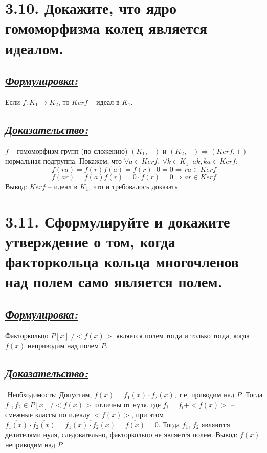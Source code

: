 \documentclass{article}
\begin{document}
\section*{\LARGE 3.10. Докажите, что ядро гомоморфизма колец является идеалом. }
\subsection*{\Large \underline{\textit{Формулировка: }}}
Если $f : K_1 \rightarrow K_2$, то $Kerf$ -- идеал в $K_1$. 

\subsection*{\Large \underline{\textit{Доказательство: }}}
$f$ -- гомоморфизм групп (по сложению) $(K_1, +)$ и $(K_2, +) \Rightarrow (Kerf, +)$ -- нормальная подгруппа. Покажем, что $\forall a \in Kerf,\: \forall k \in K_1 \;\; ak, ka \in Kerf$:
$$f(ra) = f(r)f(a) = f(r)\cdot 0 = 0 \Rightarrow ra \in Kerf$$
$$f(ar) = f(a)f(r) = 0\cdot f(r) = 0 \Rightarrow ar \in Kerf$$
Вывод: $Kerf$ -- идеал в $K_1$, что и требовалось доказать.

\section*{\LARGE 3.11. Сформулируйте и докажите утверждение о том, когда факторкольца кольца многочленов над полем само является полем. }
\subsection*{\Large \underline{\textit{Формулировка: }}}
Факторкольцо $P[x] \;/ <f(x)>$ является полем тогда и только тогда, когда $f(x)$ неприводим над полем $P$.

\subsection*{\Large \underline{\textit{Доказательство: }}}
$ $ \indent \underline{Необходимость:}
\newline Допустим, $f(x) = f_1(x) \cdot f_2(x)$, т.е. приводим над $P$. Тогда 
\newline $\overline{f_1}, \overline{f_2} \in P[x] \;/ <f(x)>$ отличны от нуля, где $\overline{f_i} = f_i + <f(x)>$ -- смежные классы по идеалу $<f(x)>$, при этом $\overline{f_1(x)}\cdot \overline{f_2(x)} = \overline{f_1(x) \cdot f_2(x)} = \overline{f(x)} = \overline{0}$. Тогда $\overline{f_1},\, \overline{f_2}$ являются делителями нуля, следовательно, факторкольцо не является полем. Вывод: $f(x)$ неприводим над $P$.
\end{document}
